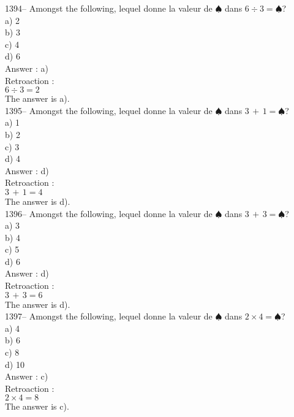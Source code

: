 ﻿\documentclass[letterpaper, 12pt]{article}
\begin{document}
1394-- Amongst the following, lequel donne la valeur de
$\spadesuit$ dans $6\div3=\spadesuit$?\\
a) 2\\
b) 3\\
c) 4\\
d) 6\\

Answer : a)\\

Retroaction : \\
$6\div3=2$\\
The answer is a).\\

1395-- Amongst the following, lequel donne la valeur de
$\spadesuit$ dans $3\,+\,1=\spadesuit$?\\
a) 1\\
b) 2\\
c) 3\\
d) 4\\

Answer : d)\\

Retroaction : \\
$3\,+\,1=4$\\
The answer is d).\\

1396-- Amongst the following, lequel donne la valeur de
$\spadesuit$ dans $3\,+\,3=\spadesuit$?\\
a) 3\\
b) 4\\
c) 5\\
d) 6\\

Answer : d)\\

Retroaction : \\
$3\,+\,3=6$\\
The answer is d).\\

1397-- Amongst the following, lequel donne la valeur de
$\spadesuit$ dans $2\times4=\spadesuit$?\\
a) 4\\
b) 6\\
c) 8\\
d) 10\\

Answer : c)\\

Retroaction : \\
$2\times4=8$\\
The answer is c).\\
\end{document}
